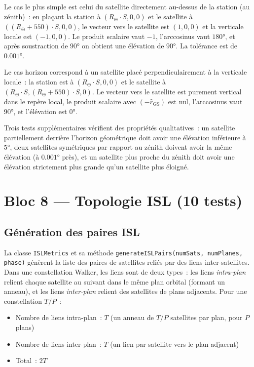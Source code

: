 \documentclass[12pt,a4paper]{article}
\begin{document}
Le cas le plus simple est celui du satellite directement au-dessus de la station (au zénith)~: en plaçant la station à $(R_\oplus \cdot S, 0, 0)$ et le satellite à $((R_\oplus + 550) \cdot S, 0, 0)$, le vecteur vers le satellite est $(1, 0, 0)$ et la verticale locale est $(-1, 0, 0)$. Le produit scalaire vaut $-1$, l'arccosinus vaut $180°$, et après soustraction de $90°$ on obtient une élévation de $90°$. La tolérance est de $0.001°$.

Le cas horizon correspond à un satellite placé perpendiculairement à la verticale locale~: la station est à $(R_\oplus \cdot S, 0, 0)$ et le satellite à $(R_\oplus \cdot S, (R_\oplus + 550) \cdot S, 0)$. Le vecteur vers le satellite est purement vertical dans le repère local, le produit scalaire avec $(-\hat{r}_\text{GS})$ est nul, l'arccosinus vaut $90°$, et l'élévation est $0°$.

Trois tests supplémentaires vérifient des propriétés qualitatives~: un satellite partiellement derrière l'horizon géométrique doit avoir une élévation inférieure à $5°$, deux satellites symétriques par rapport au zénith doivent avoir la même élévation (à $0.001°$ près), et un satellite plus proche du zénith doit avoir une élévation strictement plus grande qu'un satellite plus éloigné.

\section{Bloc 8 — Topologie ISL (10 tests)}

\subsection{Génération des paires ISL}

La classe \texttt{ISLMetrics} et sa méthode \texttt{generateISLPairs(numSats, numPlanes, phase)} génèrent la liste des paires de satellites reliés par des liens inter-satellites. Dans une constellation Walker, les liens sont de deux types~: les liens \emph{intra-plan} relient chaque satellite au suivant dans le même plan orbital (formant un anneau), et les liens \emph{inter-plan} relient des satellites de plans adjacents. Pour une constellation $T/P$~:

\begin{itemize}
    \item Nombre de liens intra-plan~: $T$ (un anneau de $T/P$ satellites par plan, pour $P$ plans)
    \item Nombre de liens inter-plan~: $T$ (un lien par satellite vers le plan adjacent)
    \item Total~: $2T$
\end{itemize}
\end{document}
